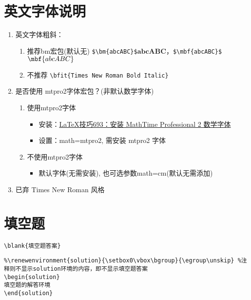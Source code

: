 \documentclass[11pt,twoside]{article}
\begin{document}
\section{英文字体说明}

\begin{enumerate}
\item 英文字体粗斜：
\begin{enumerate}
	\item 推荐bm宏包(默认无) \lstinline[style=iltx]|$\bm{abcABC}$|$\bm{abcABC}$，\lstinline[style=iltx]|$\mbf{abcABC}$|$\mbf{abcABC}$
	\item 不推荐 \lstinline[style=iltx]|| \bfit{Times New Roman Bold Italic}
\end{enumerate}
\item 是否使用 mtpro2字体宏包？(非默认数学字体)
\begin{enumerate}
\item 使用mtpro2字体
\begin{itemize}
\item 安装：\href{http://www.latexstudio.net/archives/241.html}{LaTeX技巧693：安装 MathTime Professional 2 数学字体}
\item 设置：math=mtpro2, 需安装 mtpro2 字体
\end{itemize} 
\item 不使用mtpro2字体
\begin{itemize}
\item 默认字体(无需安装), 也可选参数math=cm(默认无需添加)
\end{itemize}
\end{enumerate}
\item 已弃 Times New Roman 风格
\end{enumerate}

\section{填空题}\label{sec:tiankongti}
\lstinline[style=iltx]|\blank{填空题答案}|  
\begin{lstlisting}
%\renewenvironment{solution}{\setbox0\vbox\bgroup}{\egroup\unskip} %注释则不显示solution环境的内容，即不显示填空题答案
\begin{solution}
填空题的解答环境
\end{solution}
\end{lstlisting}
\end{document}
